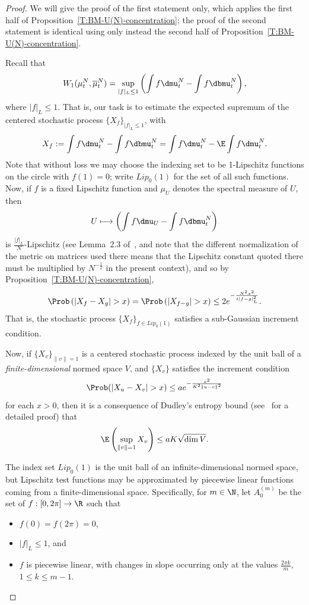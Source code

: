 \begin{proof}
We will give the proof of the first statement only, which applies the first half of Proposition~\ref{T:BM-U(N)-concentration}; the proof of the second statement is identical using only instead the second half of Proposition~\ref{T:BM-U(N)-concentration}.

Recall that
\[
W_1(\mu^N_t,\overline{\mu}^N_t)=\sup_{|f|_L\le 1}\left(\int f\dmu^N_t-\int f\dbmu^N_t\right),
\]
where $|f|_L\le 1$. That is, our task is to estimate the expected supremum of the centered stochastic process $\{X_f\}_{|f|_L\le 1}$, with
\[
X_f:=\int f\dmu^N_t-\int f\dbmu^N_t=\int f\dmu^N_t-\E\int f\dmu^N_t.
\]
Note that without loss we may choose the indexing set to be 1-Lipschitz functions on the circle with $f(1)=0$; write $Lip_0(1)$ for the set of all such functions. Now, if $f$ is a fixed Lipschitz function and $\mu_U$ denotes the spectral measure of $U$, then
\[
U\longmapsto \left(\int f\dmu_U-\int f\dbmu^N_t\right)
\]
is $\frac{|f|_L}{N}$-Lipschitz (see Lemma~2.3 of~\cite{MM-PTRF-2013}, and note that the different normalization of the metric on matrices used there means that the Lipschitz constant quoted there must be multiplied by $N^{-\frac{1}{2}}$ in the present context), and so by Proposition~\ref{T:BM-U(N)-concentration},
\[
\Prob\left(|X_f-X_g|>x\right)=\Prob\left(|X_{f-g}|>x\right)\le 2e^{-\frac{N^2x^2}{t|f-g|_L^2}}.
\]
That is, the stochastic process $\{X_f\}_{f\in Lip_0(1)}$ satisfies a sub-Gaussian increment condition.

Now, if $\{X_v\}_{\|v\|=1}$ is a centered stochastic process indexed by the unit ball of a \emph{finite-dimensional} normed space $V$, and $\{X_v\}$ satisfies the increment condition
\[
\Prob(|X_u-X_v|>x)\le a e^{-\frac{x^2}{K^2\|u-v\|^2}}
\]
for each $x>0$, then it is a consequence of Dudley's entropy bound (see~\cite{MM2016} for a detailed proof) that
\begin{equation}\label{E:fd-sup-bound}
\E\left(\sup_{\|v\|=1}X_v\right)\le aK\sqrt{\dim V}.
\end{equation}


The index set $Lip_0(1)$ is the unit ball of an infinite-dimensional normed space, but Lipschitz test functions may be approximated by piecewise linear functions coming from a finite-dimensional space. Specifically, for $m\in\N$, let $A_0^{(m)}$ be the set of $f:[0,2\pi]\to\R$ such that
\begin{itemize}
\item $f(0)=f(2\pi)=0$,
\item $|f|_L\le 1$, and
\item $f$ is piecewise linear, with changes in slope occurring only at the values $\frac{2\pi k}{m}$, $1\le k\le m-1$.
\end{itemize}


\end{proof}
